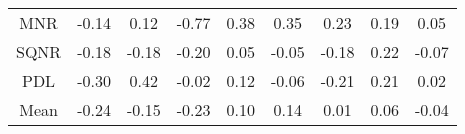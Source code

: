 \documentclass[11pt,a4paper]{report}
\begin{document}
\begin{longtable}{ | c || c | c | c | c | c | c | c || c |}
MNR &  \cellcolor[HTML]{FFFFFF} -0.14 &  \cellcolor[HTML]{FFFFFF} 0.12 &  \cellcolor[HTML]{FFEFEF} -0.77 &  \cellcolor[HTML]{F7F7FF} 0.38 &  \cellcolor[HTML]{F7F7FF} 0.35 &  \cellcolor[HTML]{F7F7FF} 0.23 &  \cellcolor[HTML]{F7F7FF} 0.19 &  \cellcolor[HTML]{FFFFFF} 0.05 \\
SQNR &  \cellcolor[HTML]{FFF7F7} -0.18 &  \cellcolor[HTML]{FFF7F7} -0.18 &  \cellcolor[HTML]{FFF7F7} -0.20 &  \cellcolor[HTML]{FFFFFF} 0.05 &  \cellcolor[HTML]{FFFFFF} -0.05 &  \cellcolor[HTML]{FFF7F7} -0.18 &  \cellcolor[HTML]{F7F7FF} 0.22 &  \cellcolor[HTML]{FFFFFF} -0.07 \\
PDL &  \cellcolor[HTML]{FFF7F7} -0.30 &  \cellcolor[HTML]{F7F7FF} 0.42 &  \cellcolor[HTML]{FFFFFF} -0.02 &  \cellcolor[HTML]{FFFFFF} 0.12 &  \cellcolor[HTML]{FFFFFF} -0.06 &  \cellcolor[HTML]{FFF7F7} -0.21 &  \cellcolor[HTML]{F7F7FF} 0.21 &  \cellcolor[HTML]{FFFFFF} 0.02 \\
\hline
\hline
Mean  &  \cellcolor[HTML]{FFF7F7} -0.24 &  \cellcolor[HTML]{FFFFFF} -0.15 &  \cellcolor[HTML]{FFF7F7} -0.23 &  \cellcolor[HTML]{FFFFFF} 0.10 &  \cellcolor[HTML]{FFFFFF} 0.14 &  \cellcolor[HTML]{FFFFFF} 0.01 &  \cellcolor[HTML]{FFFFFF} 0.06 &  \cellcolor[HTML]{FFFFFF} -0.04 \\
\hline
\end{longtable}
\end{document}
